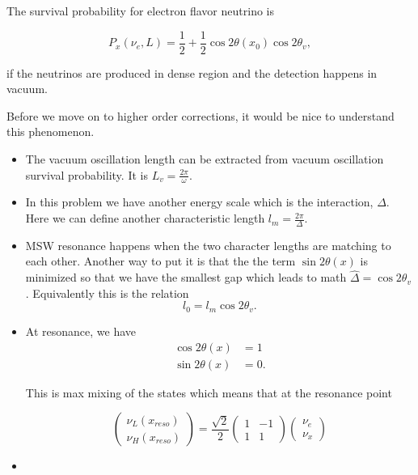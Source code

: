 \documentclass{tufte-handout}
\begin{document}
The survival probability for electron flavor neutrino is

\begin{equation*}
P_x(\nu_e,L) = \frac{1}{2} + \frac{1}{2}\cos 2\theta(x_0) \cos 2\theta_v,
\end{equation*}

if the neutrinos are produced in dense region and the detection happens in vacuum.


Before we move on to higher order corrections, it would be nice to understand this phenomenon.


\begin{itemize}
\item
The vacuum oscillation length can be extracted from vacuum oscillation survival probability. It is $L_v = \frac{2\pi}{\omega}$.
\item
In this problem we have another energy scale which is the interaction, $\Delta$. Here we can define another characteristic length $l_m = \frac{2\pi}{\Delta}$.
\item 
MSW resonance happens when the two character lengths are matching to each other. Another way to put it is that the the term $\sin 2\theta(x)$ is minimized so that we have the smallest gap which leads to math $\hat\Delta = \cos 2\theta_v$. Equivalently this is the relation
\begin{equation*}
l_0 = l_m\cos 2\theta_v.
\end{equation*}
\item
At resonance, we have
\begin{align*}
\cos 2\theta(x) &= 1 \\
\sin 2\theta(x) &= 0.
\end{align*}

This is max mixing of the states which means that at the resonance point

\begin{equation*}
\begin{pmatrix} \nu_L(x_{reso}) \\ \nu_H(x_{reso}) \end{pmatrix} = \frac{\sqrt{2}}{2}\begin{pmatrix} 1 & -1 \\ 1 & 1 \end{pmatrix} \begin{pmatrix}\nu_e \\ \nu_x \end{pmatrix}
\end{equation*}

\item


\end{itemize}
\end{document}
